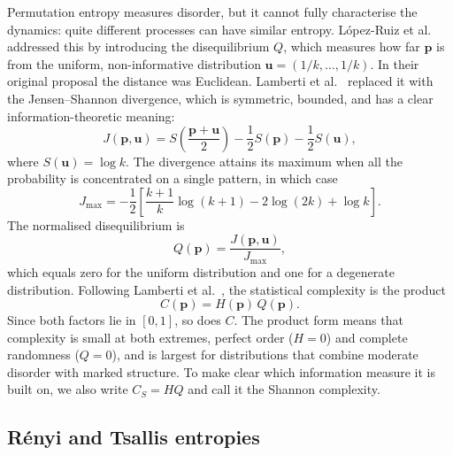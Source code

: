 Permutation entropy measures disorder, but it cannot fully characterise the dynamics: quite different processes can have similar entropy. López-Ruiz et al.~\cite{lopez1995statistical} addressed this by introducing the disequilibrium $Q$, which measures how far $\mathbf{p}$ is from the uniform, non-informative distribution $\mathbf{u}=(1/k,\dots,1/k)$. In their original proposal the distance was Euclidean. Lamberti et al.~\cite{lamberti2004intensive} replaced it with the Jensen--Shannon divergence, which is symmetric, bounded, and has a clear information-theoretic meaning:
\begin{equation}
	J(\mathbf{p},\mathbf{u})=S\!\left(\frac{\mathbf{p}+\mathbf{u}}{2}\right)-\frac{1}{2}S(\mathbf{p})-\frac{1}{2}S(\mathbf{u}),
	\label{eq:JSD}
\end{equation}
where $S(\mathbf{u})=\log k$. The divergence attains its maximum when all the probability is concentrated on a single pattern, in which case
\begin{equation}
	J_{\max}=-\frac{1}{2}\left[\frac{k+1}{k}\log(k+1)-2\log(2k)+\log k\right].
	\label{eq:JSDmax}
\end{equation}
The normalised disequilibrium is
\begin{equation}
	Q(\mathbf{p})=\frac{J(\mathbf{p},\mathbf{u})}{J_{\max}},
	\label{eq:Disequilibrium}
\end{equation}
which equals zero for the uniform distribution and one for a degenerate distribution. Following Lamberti et al.~\cite{lamberti2004intensive}, the statistical complexity is the product
\begin{equation}
	C(\mathbf{p})=H(\mathbf{p})\,Q(\mathbf{p}).
	\label{eq:Complexity}
\end{equation}
Since both factors lie in $[0,1]$, so does $C$. The product form means that complexity is small at both extremes, perfect order ($H=0$) and complete randomness ($Q=0$), and is largest for distributions that combine moderate disorder with marked structure. To make clear which information measure it is built on, we also write $C_S=HQ$ and call it the Shannon complexity.

\subsection{R\'enyi and Tsallis entropies}

